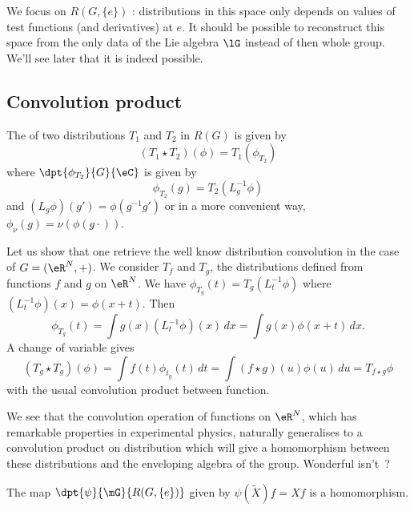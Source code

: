 We focus on $R(G,\{ e \})$ : distributions in this space only depends on values of test functions (and derivatives) at $e$. It should be possible to reconstruct this space from the only data of the Lie algebra $\lG$ instead of then whole group. We'll see later that it is indeed possible.

\subsection{Convolution product}

The  of two distributions $T_1$ and $T_2$ in $R(G)$ is given by
\begin{equation}
  (T_1\star T_2)(\phi)=T_1(\phi_{T_2})
\end{equation}
where $\dpt{\phi_{T_2}}{G}{\eC}$ is given by
\begin{equation}
   \phi_{T_2}(g)=T_2(L_g^{-1}\phi)
\end{equation}
and $(L_g\phi)(g')=\phi(g^{-1}g')$ or in a more convenient way, $\phi_{\nu}(g)=\nu(\phi(g\cdot))$.

Let us show that one retrieve the well know distribution convolution in the case of $G=(\eR^N,+)$. We consider $T_f$ and $T_g$, the distributions defined from functions $f$ and $g$ on $\eR^N$. We have $\phi_{T_g}(t)=T_g(L_t^{-1}\phi)$ where $(L_t^{-1}\phi)(x)=\phi(x+t)$. Then
\begin{equation}
  \phi_{T_g}(t)=\int g(x)(L_t^{-1}\phi)(x)\,dx
		=\int g(x)\phi(x+t)\,dx.
\end{equation}
A change of variable gives
\begin{equation}
  (T_g\star T_g)(\phi)=\int f(t)\phi_{t_g}(t)\,dt
		=\int (f\star g)(u)\phi(u)\,du
		= T_{f\star g}\phi
\end{equation}
with the usual convolution product between function.

\begin{remark}
We see that the convolution operation of functions on $\eR^N$, which has remarkable properties in experimental physics, naturally generalises to a convolution product on distribution which will give a homomorphism between these distributions and the enveloping algebra of the group. Wonderful isn't~?
\end{remark}

\begin{lemma}
The map $\dpt{\psi}{\mG}{R(G,\{ e \})}$ given by $\psi(\tilde X)f=Xf$ is a homomorphism.
\end{lemma}

